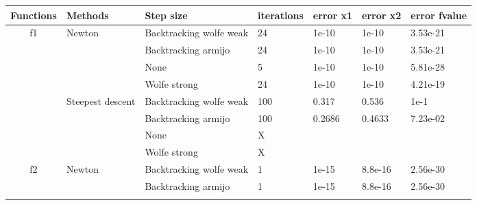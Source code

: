 \documentclass[a4paper,11pt]{article}
\numberwithin{equation}{section} %
\begin{document}

\begin{table}[h!]
\begin{tabular}{|c|l|l|l|l|l|l|}
\hline
\multicolumn{1}{|l|}{Functions} & Methods                           & Step size               & iterations & error x1 & error x2  & error fvalue \\ \hline
\multirow{8}{*}{f1}             & \multirow{4}{*}{Newton}           & Backtracking wolfe weak & 24         & 1e-10    & 1e-10     & 3.53e-21     \\ \cline{3-7}
                                &                                   & Backtracking armijo     & 24         & 1e-10    & 1e-10     & 3.53e-21     \\ \cline{3-7}
                                &                                   & None                    & 5          & 1e-10    & 1e-10     & 5.81e-28     \\ \cline{3-7}
                                &                                   & Wolfe strong            & 24         & 1e-10    & 1e-10     & 4.21e-19     \\ \cline{2-7}
                                & \multirow{4}{*}{Steepest descent} & Backtracking wolfe weak & 100        & 0.317    & 0.536     & 1e-1         \\ \cline{3-7}
                                &                                   & Backtracking armijo     & 100        & 0.2686   & 0.4633    & 7.23e-02     \\ \cline{3-7}
                                &                                   & None                    & X          &          &           &              \\ \cline{3-7}
                                &                                   & Wolfe strong            & X          &          &           &              \\ \hline
\multirow{8}{*}{f2}             & \multirow{4}{*}{Newton}           & Backtracking wolfe weak & 1          & 1e-15    & 8.8e-16   & 2.56e-30     \\ \cline{3-7}
                                &                                   & Backtracking armijo     & 1          & 1e-15    & 8.8e-16   & 2.56e-30     \\ \cline{3-7}

\end{tabular}
\end{table}
\end{document}
